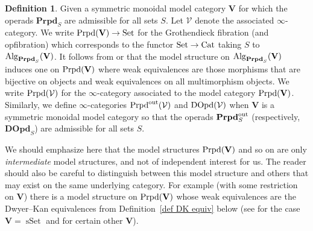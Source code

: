 \documentclass{amsart}
\numberwithin{theorem}{subsection}
\theoremstyle{definition}
\newtheorem{definition}[theorem]{Definition}
\newcommand{\xCat}{\operatorname{Cat}}
\newcommand{\xsSet}{\operatorname{sSet}}
\newcommand{\xV}{\mathcal{V}}
\newcommand{\name}[1]{\ensuremath{\text{\textup{#1}}}}
\newcommand{\Set}{\name{Set}}
\newcommand{\Alg}{\name{Alg}}
\newcommand{\bfproperad}{\mathbf{Prpd}}
\newcommand{\nmproperad}{\name{Prpd}}
\begin{document}
\begin{definition}
\label{def prpdV}
	Given a symmetric monoidal model category $\mathbf{V}$ for which the operads $\bfproperad_{S}$ are admissible for all sets $S$. 
	Let $\xV$ denote the associated $\infty$-category. We write $\nmproperad(\mathbf{V}) \to \Set$ for the Grothendieck fibration (and opfibration) which corresponds to the functor $\Set\to \xCat$ taking $S$ to $\Alg_{\bfproperad_{S}}(\mathbf{V})$. 
	It follows from \cite[Proposition 4.25]{enrcomp} or \cite[Theorem 3.0.12]{HarpazPrasma} that the model structure on $\Alg_{\bfproperad_{S}}(\mathbf{V})$ induces one on $\nmproperad(\mathbf{V}) $ where weak equivalences are those morphisms that are bijective on objects and weak equivalences on all multimorphism objects. 
	We write $\nmproperad(\xV)$ for the $\infty$-category associated to the model category $\nmproperad(\mathbf{V})$. 
	Similarly, we define $\infty$-categories $\name{Prpd}^{\name{out}}(\xV)$ and $\name{DOpd}(\xV)$ when $\mathbf{V}$ is a symmetric monoidal model category so that the operads $\mathbf{Prpd}^{\name{out}}_{S}$ (respectively, $\mathbf{DOpd}_{S}$) are admissible for all sets $S$.
\end{definition} 

We should emphasize here that the model structures $\nmproperad(\mathbf{V})$ and so on are only \emph{intermediate} model structures, and not of independent interest for us.
The reader should also be careful to distinguish between this model structure and others that may exist on the same underlying category.
For example (with some restriction on $\mathbf{V}$) there is a model structure on $\nmproperad(\mathbf{V})$ whose weak equivalences are the Dwyer--Kan equivalences from Definition~\ref{def DK equiv} below (see \cite{HackneyRobertsonYau:SMIP} for the case $\mathbf{V} = \xsSet$ and \cite{Yau:DKHTAOC} for certain other $\mathbf{V}$).
\end{document}
